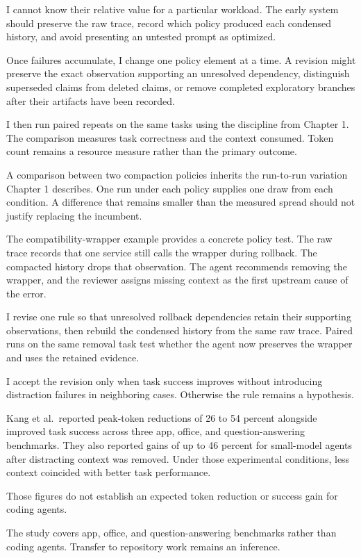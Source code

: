 I cannot know their relative value for a particular workload. The early system should preserve the raw trace, record which policy produced each condensed history, and avoid presenting an untested prompt as optimized.

Once failures accumulate, I change one policy element at a time. A revision might preserve the exact observation supporting an unresolved dependency, distinguish superseded claims from deleted claims, or remove completed exploratory branches after their artifacts have been recorded.

I then run paired repeats on the same tasks using the discipline from Chapter 1. The comparison measures task correctness and the context consumed. Token count remains a resource measure rather than the primary outcome.

A comparison between two compaction policies inherits the run-to-run variation Chapter 1 describes. One run under each policy supplies one draw from each condition. A difference that remains smaller than the measured spread should not justify replacing the incumbent.

The compatibility-wrapper example provides a concrete policy test. The raw trace records that one service still calls the wrapper during rollback. The compacted history drops that observation. The agent recommends removing the wrapper, and the reviewer assigns missing context as the first upstream cause of the error.

I revise one rule so that unresolved rollback dependencies retain their supporting observations, then rebuild the condensed history from the same raw trace. Paired runs on the same removal task test whether the agent now preserves the wrapper and uses the retained evidence.

I accept the revision only when task success improves without introducing distraction failures in neighboring cases. Otherwise the rule remains a hypothesis.

Kang et al.~reported peak-token reductions of 26 to 54 percent alongside improved task success across three app, office, and question-answering benchmarks. They also reported gains of up to 46 percent for small-model agents after distracting context was removed. Under those experimental conditions, less context coincided with better task performance.

Those figures do not establish an expected token reduction or success gain for coding agents.

The study covers app, office, and question-answering benchmarks rather than coding agents. Transfer to repository work remains an inference.

